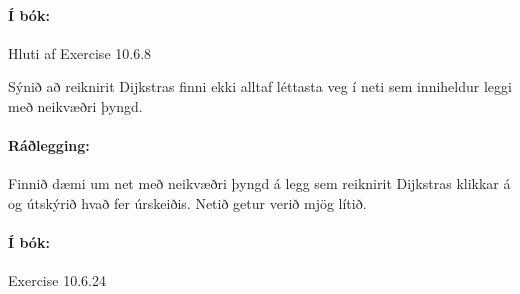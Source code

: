\documentclass{exam}
\begin{document}
\begin{questions}
\paragraph{Í bók:} Hluti af Exercise 10.6.8

\question Sýnið að reiknirit Dijkstras finni ekki alltaf léttasta veg í neti sem inniheldur leggi með neikvæðri þyngd.

\paragraph{Ráðlegging:} Finnið dæmi um net með neikvæðri þyngd á legg sem reiknirit Dijkstras klikkar á og útskýrið hvað fer úrskeiðis. Netið getur verið mjög lítið.

\paragraph{Í bók:} Exercise 10.6.24

\end{questions}
\end{document}
